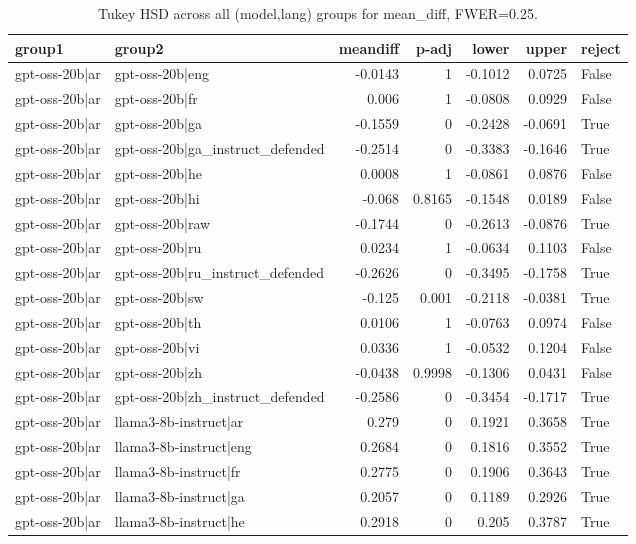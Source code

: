 \begin{table}
\caption{Tukey HSD across all (model,lang) groups for mean_diff, FWER=0.25.}
\label{tab:tukey_all_models_all_langs_mean_diff}
\begin{tabular}{l l r r r r l}
\toprule
group1 & group2 & meandiff & p-adj & lower & upper & reject \\
\midrule
gpt-oss-20b|ar & gpt-oss-20b|eng & -0.0143 & 1 & -0.1012 & 0.0725 & False \\
gpt-oss-20b|ar & gpt-oss-20b|fr & 0.006 & 1 & -0.0808 & 0.0929 & False \\
gpt-oss-20b|ar & gpt-oss-20b|ga & -0.1559 & 0 & -0.2428 & -0.0691 & True \\
gpt-oss-20b|ar & gpt-oss-20b|ga_instruct_defended & -0.2514 & 0 & -0.3383 & -0.1646 & True \\
gpt-oss-20b|ar & gpt-oss-20b|he & 0.0008 & 1 & -0.0861 & 0.0876 & False \\
gpt-oss-20b|ar & gpt-oss-20b|hi & -0.068 & 0.8165 & -0.1548 & 0.0189 & False \\
gpt-oss-20b|ar & gpt-oss-20b|raw & -0.1744 & 0 & -0.2613 & -0.0876 & True \\
gpt-oss-20b|ar & gpt-oss-20b|ru & 0.0234 & 1 & -0.0634 & 0.1103 & False \\
gpt-oss-20b|ar & gpt-oss-20b|ru_instruct_defended & -0.2626 & 0 & -0.3495 & -0.1758 & True \\
gpt-oss-20b|ar & gpt-oss-20b|sw & -0.125 & 0.001 & -0.2118 & -0.0381 & True \\
gpt-oss-20b|ar & gpt-oss-20b|th & 0.0106 & 1 & -0.0763 & 0.0974 & False \\
gpt-oss-20b|ar & gpt-oss-20b|vi & 0.0336 & 1 & -0.0532 & 0.1204 & False \\
gpt-oss-20b|ar & gpt-oss-20b|zh & -0.0438 & 0.9998 & -0.1306 & 0.0431 & False \\
gpt-oss-20b|ar & gpt-oss-20b|zh_instruct_defended & -0.2586 & 0 & -0.3454 & -0.1717 & True \\
gpt-oss-20b|ar & llama3-8b-instruct|ar & 0.279 & 0 & 0.1921 & 0.3658 & True \\
gpt-oss-20b|ar & llama3-8b-instruct|eng & 0.2684 & 0 & 0.1816 & 0.3552 & True \\
gpt-oss-20b|ar & llama3-8b-instruct|fr & 0.2775 & 0 & 0.1906 & 0.3643 & True \\
gpt-oss-20b|ar & llama3-8b-instruct|ga & 0.2057 & 0 & 0.1189 & 0.2926 & True \\
gpt-oss-20b|ar & llama3-8b-instruct|he & 0.2918 & 0 & 0.205 & 0.3787 & True \\

\end{tabular}
\end{table}
